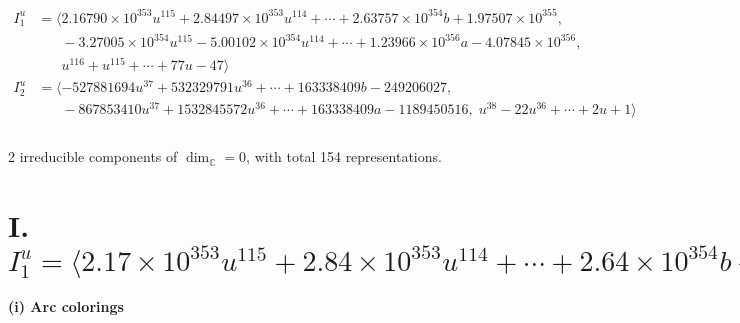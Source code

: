 \documentclass[1p]{elsarticle_modified}
\theoremstyle{definition}
\begin{document}
\begin{align*}
I^u_{1}&=\langle 
2.16790\times10^{353} u^{115}+2.84497\times10^{353} u^{114}+\cdots+2.63757\times10^{354} b+1.97507\times10^{355},\\
\phantom{I^u_{1}}&\phantom{= \langle  }-3.27005\times10^{354} u^{115}-5.00102\times10^{354} u^{114}+\cdots+1.23966\times10^{356} a-4.07845\times10^{356},\\
\phantom{I^u_{1}}&\phantom{= \langle  }u^{116}+u^{115}+\cdots+77 u-47\rangle \\
I^u_{2}&=\langle 
-527881694 u^{37}+532329791 u^{36}+\cdots+163338409 b-249206027,\\
\phantom{I^u_{2}}&\phantom{= \langle  }-867853410 u^{37}+1532845572 u^{36}+\cdots+163338409 a-1189450516,\;u^{38}-22 u^{36}+\cdots+2 u+1\rangle \\
\\
\end{align*}
\raggedright * 2 irreducible components of $\dim_{\mathbb{C}}=0$, with total 154 representations.\\
\newpage
\renewcommand{\arraystretch}{1}
\centering \section*{I. $I^u_{1}= \langle 2.17\times10^{353} u^{115}+2.84\times10^{353} u^{114}+\cdots+2.64\times10^{354} b+1.98\times10^{355},\;-3.27\times10^{354} u^{115}-5.00\times10^{354} u^{114}+\cdots+1.24\times10^{356} a-4.08\times10^{356},\;u^{116}+u^{115}+\cdots+77 u-47 \rangle$}
\flushleft \textbf{(i) Arc colorings}\\
\end{document}
